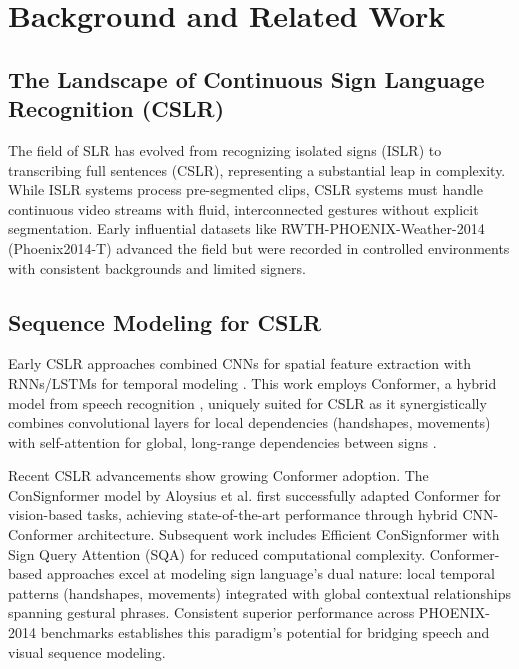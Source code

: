\section{Background and Related Work}
\label{sec:formatting}

\subsection{The Landscape of Continuous Sign Language Recognition (CSLR)}

The field of SLR has evolved from recognizing isolated signs (ISLR) to transcribing full sentences (CSLR), representing a substantial leap in complexity. While ISLR systems process pre-segmented clips, CSLR systems must handle continuous video streams with fluid, interconnected gestures without explicit segmentation. Early influential datasets like RWTH-PHOENIX-Weather-2014 (Phoenix2014-T) \cite{camgoz2018neural} advanced the field but were recorded in controlled environments with consistent backgrounds and limited signers.

\subsection{Sequence Modeling for CSLR}
 
Early CSLR approaches combined CNNs for spatial feature extraction with RNNs/LSTMs for temporal modeling \cite{huang2024video}. This work employs Conformer, a hybrid model from speech recognition \cite{gulati2020conformer}, uniquely suited for CSLR as it synergistically combines convolutional layers for local dependencies (handshapes, movements) with self-attention for global, long-range dependencies between signs \cite{camgoz2018neural}.

Recent CSLR advancements show growing Conformer adoption. The ConSignformer model \cite{aloysius2024continuous} by Aloysius et al. first successfully adapted Conformer for vision-based tasks, achieving state-of-the-art performance through hybrid CNN-Conformer architecture. Subsequent work includes Efficient ConSignformer with Sign Query Attention (SQA) \cite{aloysius2025optimized} for reduced computational complexity. Conformer-based approaches excel at modeling sign language's dual nature: local temporal patterns (handshapes, movements) integrated with global contextual relationships spanning gestural phrases. Consistent superior performance across PHOENIX-2014 benchmarks \cite{camgoz2018neural} establishes this paradigm's potential for bridging speech and visual sequence modeling.

